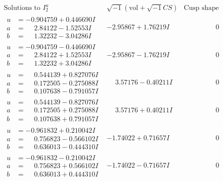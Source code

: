 \documentclass[1p]{elsarticle_modified}
\theoremstyle{definition}
\newcommand{\I}{\sqrt{-1}}
\begin{document}
$$\begin{array}{c|c|c}  
\text{Solutions to }I^u_{2}& \I (\text{vol} + \sqrt{-1}CS) & \text{Cusp shape}\\
 \hline 
\begin{aligned}
u &= -0.904759 + 0.446690 I \\
a &= \phantom{-}2.84122 - 1.52553 I \\
b &= \phantom{-}1.32232 - 3.04286 I\end{aligned}
 & -2.95867 + 1.76219 I & \phantom{-0.000000 } 0 \\ \hline\begin{aligned}
u &= -0.904759 - 0.446690 I \\
a &= \phantom{-}2.84122 + 1.52553 I \\
b &= \phantom{-}1.32232 + 3.04286 I\end{aligned}
 & -2.95867 - 1.76219 I & \phantom{-0.000000 } 0 \\ \hline\begin{aligned}
u &= \phantom{-}0.544139 + 0.827076 I \\
a &= \phantom{-}0.172505 - 0.275088 I \\
b &= \phantom{-}0.107638 - 0.791057 I\end{aligned}
 & \phantom{-}3.57176 - 0.40211 I & \phantom{-0.000000 } 0 \\ \hline\begin{aligned}
u &= \phantom{-}0.544139 - 0.827076 I \\
a &= \phantom{-}0.172505 + 0.275088 I \\
b &= \phantom{-}0.107638 + 0.791057 I\end{aligned}
 & \phantom{-}3.57176 + 0.40211 I & \phantom{-0.000000 } 0 \\ \hline\begin{aligned}
u &= -0.961832 + 0.210042 I \\
a &= \phantom{-}0.756823 - 0.566102 I \\
b &= \phantom{-}0.636013 - 0.444310 I\end{aligned}
 & -1.74022 + 0.71657 I & \phantom{-0.000000 } 0 \\ \hline\begin{aligned}
u &= -0.961832 - 0.210042 I \\
a &= \phantom{-}0.756823 + 0.566102 I \\
b &= \phantom{-}0.636013 + 0.444310 I\end{aligned}
 & -1.74022 - 0.71657 I & \phantom{-0.000000 } 0 \\ \hline\begin{aligned}

\end{aligned}
\end{array}$$
\end{document}
